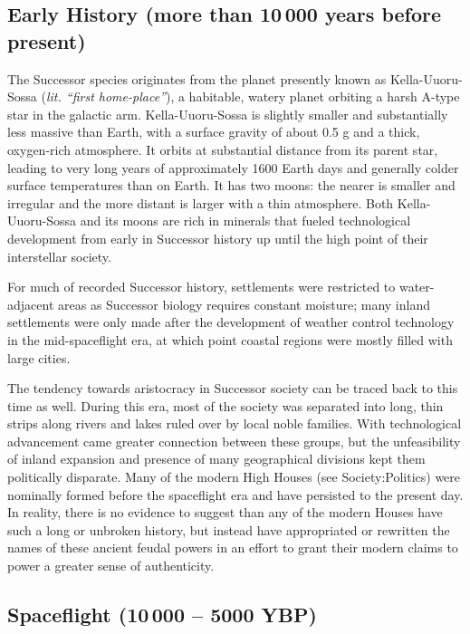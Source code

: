 \documentclass[11pt]{report}
\begin{document}
    \subsection{Early History (more than 10\,000 years before present)}
    The Successor species originates from the planet presently known as Kella-Uuoru-Sossa (\emph{lit. ``first home-place''}), a habitable, watery planet orbiting a harsh A-type star in the galactic arm. Kella-Uuoru-Sossa is slightly smaller and substantially less massive than Earth, with a surface gravity of about 0.5 g and a thick, oxygen-rich atmosphere. It orbits at substantial distance from its parent star, leading to very long years of approximately 1600 Earth days and generally colder surface temperatures than on Earth. It has two moons: the nearer is smaller and irregular and the more distant is larger with a thin atmosphere. Both Kella-Uuoru-Sossa and its moons are rich in minerals that fueled technological development from early in Successor history up until the high point of their interstellar society.
    
    For much of recorded Successor history, settlements were restricted to water-adjacent areas as Successor biology requires constant moisture; many inland settlements were only made after the development of weather control technology in the mid-spaceflight era, at which point coastal regions were mostly filled with large cities.

    The tendency towards aristocracy in Successor society can be traced back to this time as well. During this era, most of the society was separated into long, thin strips along rivers and lakes ruled over by local noble families. With technological advancement came greater connection between these groups, but the unfeasibility of inland expansion and presence of many geographical divisions kept them politically disparate. Many of the modern High Houses (see Society:Politics) were nominally formed before the spaceflight era and have persisted to the present day. In reality, there is no evidence to suggest than any of the modern Houses have such a long or unbroken history, but instead have appropriated or rewritten the names of these ancient feudal powers in an effort to grant their modern claims to power a greater sense of authenticity. 

    \subsection{Spaceflight (10\,000 -- 5000 YBP)}
\end{document}
